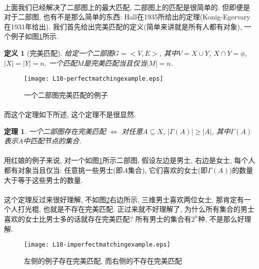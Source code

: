 \documentclass[a4paper]{article}
\newtheorem*{theorem}{定理}
\newtheorem*{definition}{定义}
\renewcommand{\figurename}{图}
\begin{document}
        \paragraph{}上面我们已经解决了二部图上的最大匹配, 二部图上的匹配是很简单的. 但即便是对于二部图, 也有不是那么简单的东西: Hall在1935所给出的定理(Konig-Egervary在1931年给出). 我们首先给出完美匹配的定义(简单来讲就是所有人都有对象), 一个例子如\figurename\ref{Figure: matching_perfect_matching_example}所示.
        \begin{definition}[完美匹配]
给定一个二部图$G=<V,E>$, 其中$V=X\cup Y$, $X \cap Y = \phi$, $|X|=|Y|=n$. 一个匹配$M$是完美匹配当且仅当$|M|=n$.
        \end{definition}
        \begin{figure}[h]
            \centering
            \texttt{[image: L10-perfectmatchingexample.eps]}
            \caption{一个二部图完美匹配的例子}
            \label{Figure: matching_perfect_matching_example}
        \end{figure}
        
        
            \paragraph{}而这个定理如下所述, 这个定理不是很显然.
\begin{theorem}
一个二部图存在完美匹配 $\Leftrightarrow$ 对任意$A \subseteq X$, $ |\Gamma(A) | \geq |A|$, 其中$\Gamma(A)$表示$A$中匹配节点的集合.%
\end{theorem}
            \paragraph{}用红娘的例子来说, 对一个如\figurename\ref{Figure: matching_perfect_matching_example}所示二部图, 假设左边是男士, 右边是女士, 每个人都有对象当且仅当: 任意挑一些男士(即$A$集合), 它们喜欢的女士(即$\Gamma(A)$)的数量大于等于这些男士的数量. 
            \paragraph{}这个定理反过来很好理解, 不如\figurename\ref{Figure: matching_perfect_and_imperfect_example}右边所示, 三维男士喜欢两位女士, 那肯定有一个人打光棍, 也就是不存在完美匹配. 正过来就不好理解了, 为什么所有集合的男士喜欢的女士比男士多的话就存在完美匹配? 所有男士的集合有$2^n$种, 不是那么好理解.

\begin{figure}[h]
        \centering
        \texttt{[image: L10-imperfectmatchingexample.eps]}
        \caption{左侧的例子存在完美匹配, 而右侧的不存在完美匹配}
        \label{Figure: matching_perfect_and_imperfect_example}
\end{figure}
    
\end{document}
